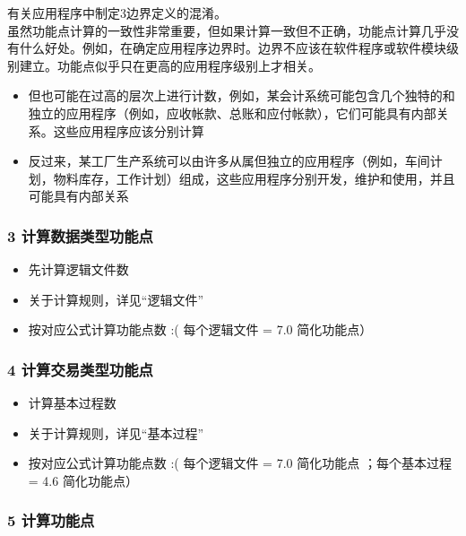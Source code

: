\documentclass{book}        %
\providecommand{\tightlist}{%
  \setlength{\itemsep}{0pt}\setlength{\parskip}{0pt}}
\begin{document}
有关应用程序中制定3边界定义的混淆。\\
虽然功能点计算的一致性非常重要，但如果计算一致但不正确，功能点计算几乎没有什么好处。例如，在确定应用程序边界时。边界不应该在软件程序或软件模块级别建立。功能点似乎只在更高的应用程序级别上才相关。

\begin{itemize}
\tightlist
\item
  但也可能在过高的层次上进行计数，例如，某会计系统可能包含几个独特的和独立的应用程序（例如，应收帐款、总账和应付帐款），它们可能具有内部关系。这些应用程序应该分别计算
\item
  反过来，某工厂生产系统可以由许多从属但独立的应用程序（例如，车间计划，物料库存，工作计划）组成，这些应用程序分别开发，维护和使用，并且可能具有内部关系
\end{itemize}

\hypertarget{ux8ba1ux7b97ux6570ux636eux7c7bux578bux529fux80fdux70b9}{%
\subsubsection{3
计算数据类型功能点}\label{ux8ba1ux7b97ux6570ux636eux7c7bux578bux529fux80fdux70b9}}

\begin{itemize}
\tightlist
\item
  先计算逻辑文件数
\item
  关于计算规则，详见``逻辑文件''
\item
  按对应公式计算功能点数 :( 每个逻辑文件 = 7.0 简化功能点）
\end{itemize}

\hypertarget{ux8ba1ux7b97ux4ea4ux6613ux7c7bux578bux529fux80fdux70b9}{%
\subsubsection{4
计算交易类型功能点}\label{ux8ba1ux7b97ux4ea4ux6613ux7c7bux578bux529fux80fdux70b9}}

\begin{itemize}
\tightlist
\item
  计算基本过程数
\item
  关于计算规则，详见``基本过程''
\item
  按对应公式计算功能点数 :( 每个逻辑文件 = 7.0 简化功能点 ；每个基本过程
  = 4.6 简化功能点）
\end{itemize}

\hypertarget{ux8ba1ux7b97ux529fux80fdux70b9}{%
\subsubsection{5 计算功能点}\label{ux8ba1ux7b97ux529fux80fdux70b9}}
\end{document}
